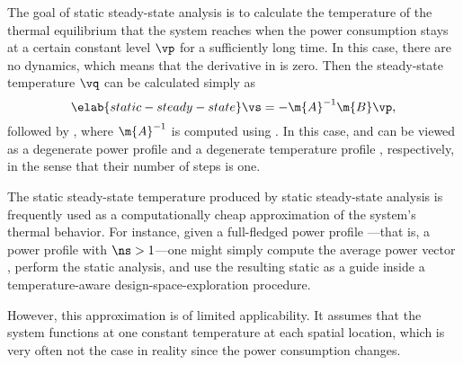 The goal of static steady-state analysis is to calculate the temperature of the
thermal equilibrium that the system reaches when the power consumption stays at
a certain constant level $\vp$ for a sufficiently long time. In this case, there
are no dynamics, which means that the derivative in
 is zero. Then the steady-state temperature $\vq$
can be calculated simply as
\begin{equation} \elab{static-steady-state}
  \vs = -\m{A}^{-1} \m{B} \vp,
\end{equation}
followed by , where $\m{A}^{-1}$ is computed using
. In this case, \vp and \vq can be viewed as a degenerate
power profile \mp and a degenerate temperature profile \mq, respectively, in the
sense that their number of steps \ns is one.

The static steady-state temperature produced by static steady-state analysis is
frequently used as a computationally cheap approximation of the system's thermal
behavior. For instance, given a full-fledged power profile \mp---that is, a
power profile with $\ns > 1$---one might simply compute the average power vector
\vp, perform the static analysis, and use the resulting static \vq as a guide
inside a temperature-aware design-space-exploration procedure.

However, this approximation is of limited applicability. It assumes that the
system functions at one constant temperature at each spatial location, which is
very often not the case in reality since the power consumption changes.
